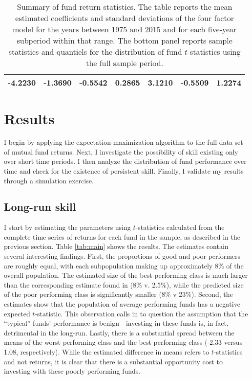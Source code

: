 \begin{table}[p]
\begin{tabular}{*{7}{c}}
		\midrule
		-4.2230 & -1.3690 & -0.5542 & 0.2865 & 3.1210 & -0.5509 & 1.2274 \\
		\bottomrule
		\end{tabular}
		\captionsetup{position=below, font=footnotesize, justification=justified, width=0.83\linewidth}
		\caption[Summary of fund return statistics]{Summary of fund return statistics. The table reports the mean estimated coefficients and standard deviations of the \citet{Carhart1997} four factor model for the years between 1975 and 2015 and for each five-year subperiod within that range. The bottom panel reports sample statistics and quantiels for the distribution of fund $t$-statistics using the full sample period.}
		\label{tab:summary}
	\end{table}


\section{Results}
	I begin by applying the expectation-maximization algorithm to the full data set of mutual fund returns. Next, I investigate the possibility of skill existing only over short time periods. I then analyze the distribution of fund performance over time and check for the existence of persistent skill. Finally, I validate my results through a simulation exercise.

	\subsection{Long-run skill}
		I start by estimating the parameters using $t$-statistics calculated from the complete time series of returns for each fund in the sample, as described in the previous section. Table \ref{tab:main} shows the results. The estimates contain several interesting findings.  First, the proportions of good and poor performers are roughly equal, with each subpopulation making up approximately 8\% of the overall population.  The estimated size of the best performing class is much larger than the corresponding estimate found in \citet{Barras2010} (8\% v. 2.5\%), while the predicted size of the poor performing class is significantly smaller (8\% v 23\%). Second, the estimates show that the population of average performing funds has a negative expected $t$-statistic.  This observation calls in to question the assumption that the ``typical'' funds' performance is benign---investing in these funds is, in fact, detrimental in the long-run.  Lastly, there is a substantial spread between the means of the worst performing class and the best performing class (-2.33 versus 1.08, respectively). While the estimated difference in means refers to $t$-statistics and not returns, it is clear that there is a substantial opportunity cost to investing with these poorly performing funds.

